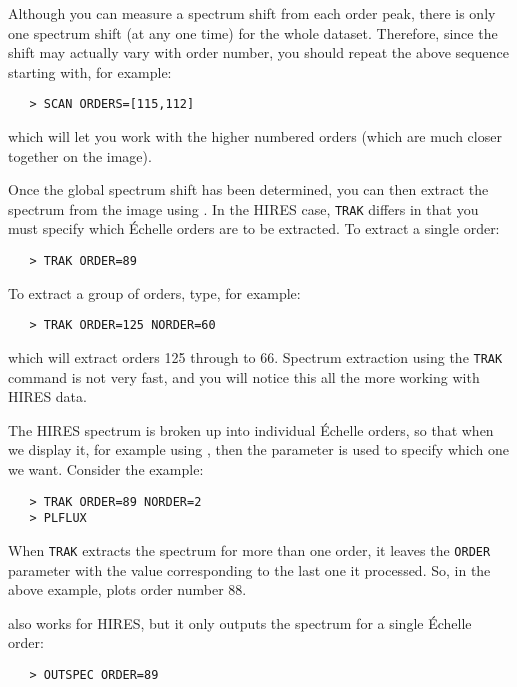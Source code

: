Although you can measure a spectrum shift from each order peak, there is
only one spectrum shift (at any one time) for the whole dataset.
Therefore, since the shift may actually vary with order number, you
should repeat the above sequence starting with, for example:

\begin{verbatim}
   > SCAN ORDERS=[115,112]
\end{verbatim}

which will let you work with the higher numbered orders (which are much
closer together on the image)\@.

Once the global spectrum shift has been determined, you can then extract the
spectrum from the image using \@. In the HIRES
case, \verb+TRAK+
differs in that you must specify which \'{E}chelle orders are to be extracted.
To extract a single order:

\begin{verbatim}
   > TRAK ORDER=89
\end{verbatim}

To extract a group of orders, type, for example:

\begin{verbatim}
   > TRAK ORDER=125 NORDER=60
\end{verbatim}

which will extract orders 125 through to 66.  Spectrum extraction using
the \verb+TRAK+ command is not very fast, and you will notice this all the more
working with HIRES data.

The HIRES spectrum is broken up into individual \'{E}chelle orders, so that
when we display it, for example using ,
then the 
parameter is used to specify which one we want.  Consider the example:

\begin{verbatim}
   > TRAK ORDER=89 NORDER=2
   > PLFLUX
\end{verbatim}

When \verb+TRAK+ extracts the spectrum for more than one order, it leaves the
\verb+ORDER+ parameter with the value corresponding to the last one it
processed.  So, in the above example, 
 plots order number 88.

 also works for HIRES, but it only outputs the spectrum for a
single \'{E}chelle order:

\begin{verbatim}
   > OUTSPEC ORDER=89
\end{verbatim}

